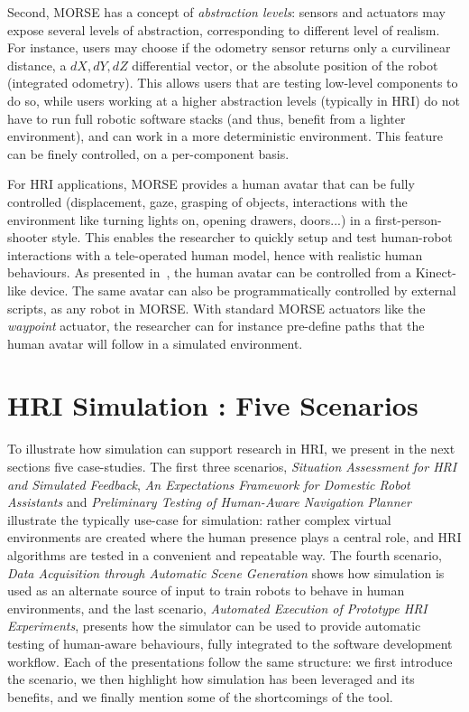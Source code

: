 \documentclass[conference]{IEEEtran}
\begin{document}
Second, MORSE has a concept of \emph{abstraction levels}: sensors and actuators
may expose several levels of abstraction, corresponding to different level of
realism. For instance, users may choose if the odometry sensor returns only a
curvilinear distance, a $dX, dY, dZ$ differential vector, or the absolute
position of the robot (integrated odometry). This allows users that are testing
low-level components to do so, while users working at a higher abstraction
levels (typically in HRI) do not have to run full robotic software stacks (and
thus, benefit from a lighter environment), and can work in a more deterministic
environment. This feature can be finely controlled, on a per-component basis.

For HRI applications, MORSE provides a human avatar that can be fully controlled
(displacement, gaze, grasping of objects, interactions with the environment like
turning lights on, opening drawers, doors...) in a first-person-shooter style.
This enables the researcher to quickly setup and test human-robot interactions
with a tele-operated human model, hence with realistic human behaviours. As
presented in~\cite{lemaignan2012morse}, the human avatar can be controlled from
a Kinect-like device.  The same avatar can also be programmatically controlled
by external scripts, as any robot in MORSE. With standard MORSE actuators like
the \emph{waypoint} actuator, the researcher can for instance pre-define paths
that the human avatar will follow in a simulated environment.



\section{HRI Simulation : Five Scenarios}

To illustrate how simulation can support research in HRI, we present in the next
sections five case-studies.  The first three scenarios, \emph{Situation
Assessment for HRI and Simulated Feedback}, \emph{An Expectations Framework for
Domestic Robot Assistants} and \emph{Preliminary Testing of Human-Aware
Navigation Planner} illustrate the typically use-case for simulation: rather
complex virtual environments are created where the human presence plays a
central role, and HRI algorithms are tested in a convenient and repeatable way.
The fourth scenario, \emph{Data Acquisition through Automatic Scene Generation}
shows how simulation is used as an alternate source of input to train robots to
behave in human environments, and the last scenario, \emph{Automated Execution
of Prototype HRI Experiments}, presents how the simulator can be used to provide
automatic testing of human-aware behaviours, fully integrated to the software
development workflow. Each of the presentations follow the same structure: we
first introduce the scenario, we then highlight how simulation has been leveraged
and its benefits, and we finally mention some of the shortcomings of the tool.
\end{document}
